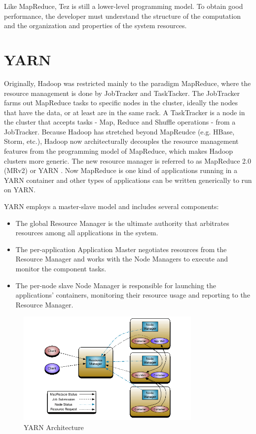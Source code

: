 \documentclass[11pt]{book}
\begin{document}
Like MapReduce, Tez is still a lower-level programming model. To obtain good performance, the developer must understand the structure of the computation and the organization and properties of the system resources. 

\section[YARN]
{YARN}
 Originally, Hadoop was restricted mainly to the paradigm MapReduce, where the resource management is done by JobTracker and TaskTacker.
The JobTracker farms out MapReduce tasks to specific nodes in the cluster, ideally the nodes that have the data, or at least are in the same rack. A TaskTracker is a node in the cluster that accepts tasks - Map, Reduce and Shuffle operations - from a JobTracker. Because Hadoop has stretched beyond MapReudce (e.g. HBase, Storm, etc.), Hadoop now architecturally decouples the resource management features from the programming model of MapReduce, which makes Hadoop clusters more generic. The new resource manager is referred to as MapReduce 2.0 (MRv2) or YARN \cite{YARN2011:279}. Now MapReduce is one kind of applications running in a YARN container and other types of applications can be written generically to run on YARN.

YARN employs a master-slave model and includes several components:
\begin{itemize}
\item The global Resource Manager is the ultimate authority that arbitrates resources among all applications in the system.
\item The per-application Application Master negotiates resources from the Resource Manager and works with the Node Managers to execute and monitor the component tasks.
\item The per-node slave Node Manager is responsible for launching the applications' containers, monitoring their resource usage and reporting to the Resource Manager.
\end{itemize}

\begin{figure}[t]
\includegraphics[width=0.8\textwidth]{images/yarn-architecture.png}
\centering
\caption{YARN Architecture}
\end{figure}
\end{document}
